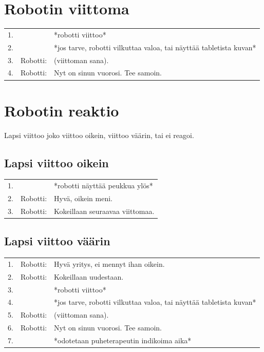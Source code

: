 \section{Robotin viittoma}
\begin{tabular}{llp{10cm}}
 1. &  & *robotti viittoo* \\
 2. & & *jos tarve, robotti vilkuttaa valoa, tai näyttää tabletista kuvan* \\
 3. & Robotti: & (viittoman sana). \\
 4. & Robotti: & Nyt on sinun vuorosi. Tee samoin. \\
\end{tabular}


\section{Robotin reaktio}

Lapsi viittoo joko viittoo oikein, viittoo väärin, tai ei reagoi.

\subsection{Lapsi viittoo oikein}
\begin{tabular}{llp{10cm}}
 1. &  & *robotti näyttää peukkua ylös* \\
 2. & Robotti: & Hyvä, oikein meni.\\
 3. & Robotti: & Kokeillaan seuraavaa viittomaa.  \\
\end{tabular}


\subsection{Lapsi viittoo väärin}
\begin{tabular}{llp{10cm}}
 1. & Robotti: & Hyvä yritys, ei mennyt ihan oikein. \\
 2. & Robotti: & Kokeillaan uudestaan. \\
 3. & & *robotti viittoo* \\
 4. & & *jos tarve, robotti vilkuttaa valoa, tai näyttää tabletista kuvan* \\
 5. & Robotti: & (viittoman sana). \\
 6. & Robotti: & Nyt on sinun vuorosi. Tee samoin. \\
 7. & & *odotetaan puheterapeutin indikoima aika* \\
\end{tabular}

